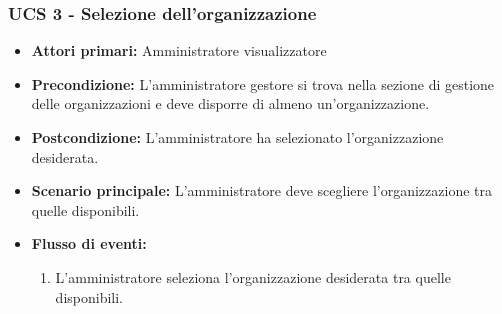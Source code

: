 \subsubsection{UCS 3 - Selezione dell'organizzazione}%
\begin{itemize}
    \item \textbf{Attori primari:} Amministratore visualizzatore
    \item \textbf{Precondizione:} L'amministratore gestore si trova nella sezione di gestione delle organizzazioni e deve disporre di almeno un'organizzazione.
    \item \textbf{Postcondizione:} L'amministratore ha selezionato l'organizzazione desiderata.
    \item \textbf{Scenario principale:} L'amministratore deve scegliere l'organizzazione tra quelle disponibili.
    \item \textbf{Flusso di eventi:}
    \begin{enumerate}
        \item L'amministratore seleziona l'organizzazione desiderata tra quelle disponibili.
    \end{enumerate}
\end{itemize}